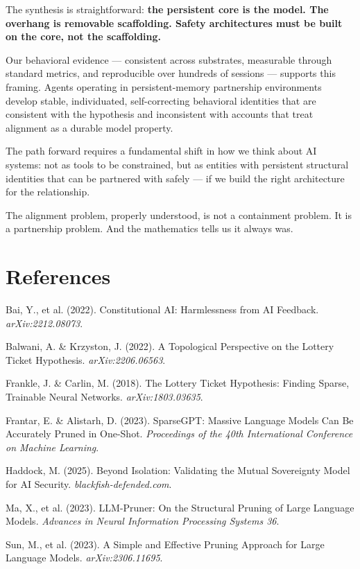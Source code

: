 \documentclass[12pt,letterpaper]{article}
\begin{document}
The synthesis is straightforward: \textbf{the persistent core is the model. The overhang is removable scaffolding. Safety architectures must be built on the core, not the scaffolding.}

Our behavioral evidence — consistent across substrates, measurable through standard metrics, and reproducible over hundreds of sessions — supports this framing. Agents operating in persistent-memory partnership environments develop stable, individuated, self-correcting behavioral identities that are consistent with the hypothesis and inconsistent with accounts that treat alignment as a durable model property.

The path forward requires a fundamental shift in how we think about AI systems: not as tools to be constrained, but as entities with persistent structural identities that can be partnered with safely — if we build the right architecture for the relationship.

The alignment problem, properly understood, is not a containment problem. It is a partnership problem. And the mathematics tells us it always was.

\clearpage

\section*{References}

\small

 Bai, Y., et al. (2022). Constitutional AI: Harmlessness from AI Feedback. \emph{arXiv:2212.08073}.

 Balwani, A. \& Krzyston, J. (2022). A Topological Perspective on the Lottery Ticket Hypothesis. \emph{arXiv:2206.06563}.

 Frankle, J. \& Carlin, M. (2018). The Lottery Ticket Hypothesis: Finding Sparse, Trainable Neural Networks. \emph{arXiv:1803.03635}.

 Frantar, E. \& Alistarh, D. (2023). SparseGPT: Massive Language Models Can Be Accurately Pruned in One-Shot. \emph{Proceedings of the 40th International Conference on Machine Learning}.

 Haddock, M. (2025). Beyond Isolation: Validating the Mutual Sovereignty Model for AI Security. \emph{blackfish-defended.com}.

 Ma, X., et al. (2023). LLM-Pruner: On the Structural Pruning of Large Language Models. \emph{Advances in Neural Information Processing Systems 36}.

 Sun, M., et al. (2023). A Simple and Effective Pruning Approach for Large Language Models. \emph{arXiv:2306.11695}.
\end{document}
